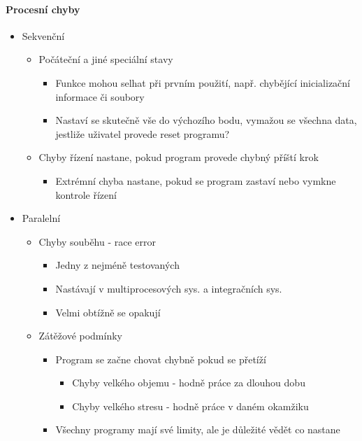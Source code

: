 \paragraph{Procesní chyby}
\begin{itemize}[itemsep=0px]
\item Sekvenční
    \begin{itemize}[itemsep=0px]
    \item Počáteční a jiné speciální stavy
        \begin{itemize}[itemsep=0px]
        \item Funkce mohou selhat při prvním použití, např. chybějící inicializační informace či soubory
        \item Nastaví se skutečně vše do výchozího bodu, vymažou se všechna data, jestliže uživatel provede reset programu?
        \end{itemize}
    \item Chyby řízení nastane, pokud program provede chybný příští krok
        \begin{itemize}[itemsep=0px]
        \item Extrémní chyba nastane, pokud se program zastaví nebo vymkne kontrole řízení
        \end{itemize}
    \end{itemize}
\item Paralelní
    \begin{itemize}[itemsep=0px]
    \item Chyby souběhu - race error
        \begin{itemize}[itemsep=0px]
        \item Jedny z nejméně testovaných
        \item Nastávají v multiprocesových sys. a integračních sys.
        \item Velmi obtížně se opakují
        \end{itemize}
    \item Zátěžové podmínky
        \begin{itemize}[itemsep=0px]
        \item Program se začne chovat chybně pokud se přetíží
            \begin{itemize}[itemsep=0px]
            \item Chyby velkého objemu - hodně práce za dlouhou dobu
            \item Chyby velkého stresu - hodně práce v daném okamžiku
            \end{itemize}
        \item Všechny programy mají své limity, ale je důležité vědět co nastane
        \end{itemize}
    \end{itemize}
\end{itemize}

